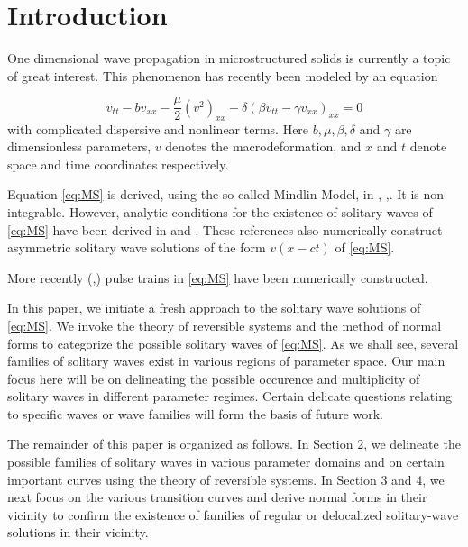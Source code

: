 \section{Introduction}

One dimensional wave propagation in microstructured solids is currently a topic of great interest.
This phenomenon has recently been modeled \cite{STE} by an equation

\begin{equation}\label{eq:MS}
v_{tt} - b v_{xx} - \frac{\mu}{2} \left( v^2 \right)_{xx} - \delta \left( \beta v_{tt} - \gamma v_{xx}\right)_{xx} = 0 
\end{equation}
with complicated dispersive and nonlinear terms. Here $b, \mu, \beta, \delta$
and $\gamma$ are dimensionless parameters, $v$ denotes the macrodeformation,
and $x$ and $t$ denote space and time coordinates respectively.

Equation \eqref{eq:MS} is derived, using the so-called Mindlin Model, in
\cite{STE}, \cite{JE1},\cite{JE2}.  It is non-integrable. However, analytic
conditions for the existence of solitary waves of \eqref{eq:MS} have been
derived in \cite{JE2} and \cite{STE}. These references also numerically
construct asymmetric solitary wave solutions of the form $ v\left(x - c t
\right)$ of \eqref{eq:MS}.

More recently (\cite{EP},\cite{EBS}) pulse trains in \eqref{eq:MS} have been
numerically constructed.

In this paper, we initiate a fresh approach to the solitary wave solutions of
\eqref{eq:MS}.  We invoke the theory of reversible systems and the method of
normal forms to categorize the possible solitary waves of \eqref{eq:MS}.  As we
shall see, several families of solitary waves exist in various regions of
parameter space. Our main focus here will be on delineating the possible
occurence and multiplicity of solitary waves in different parameter regimes.
Certain delicate questions relating to specific waves or wave families will
form the basis of future work. 

The remainder of this paper is organized as follows. In Section 2, we delineate
the possible families of solitary waves in various parameter domains and on
certain important curves using the theory of reversible systems. In Section 3
and 4, we next focus on the various transition curves and derive normal forms
in their vicinity to confirm the existence of families of regular or
delocalized solitary-wave solutions in their vicinity.



